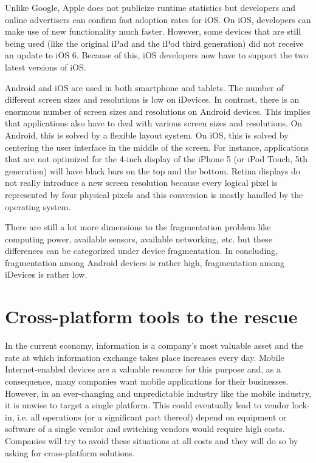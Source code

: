 Unlike Google, Apple does not publicize runtime statistics but developers \cite{Smith:2013} and online advertisers \cite{Chitika:2013} can confirm fast adoption rates for iOS. On iOS, developers can make use of new functionality much faster. However, some devices that are still being used (like the original iPad and the iPod third generation) did not receive an update to iOS 6. Because of this, iOS developers now have to support the two latest versions of iOS.

Android and iOS are used in both smartphone and tablets. The number of different screen sizes and resolutions is low on iDevices. In contrast, there is an enormous number of screen sizes and resolutions on Android devices. This implies that applications also have to deal with various screen sizes and resolutions. On Android, this is solved by a flexible layout system. On iOS, this is solved by centering the user interface in the middle of the screen. For instance, applications that are not optimized for the 4-inch display of the iPhone 5 (or iPod Touch, 5th generation) will have black bars on the top and the bottom. Retina displays do not really introduce a new screen resolution because every logical pixel is represented by four physical pixels and this conversion is mostly handled by the operating system.

There are still a lot more dimensions to the fragmentation problem like computing power, available sensors, available networking, etc. but these differences can be categorized under device fragmentation. In concluding, fragmentation among Android devices is rather high, fragmentation among iDevices is rather low.

\section{Cross-platform tools to the rescue}

In the current economy, information is a company's most valuable asset and the rate at which information exchange takes place increases every day. Mobile Internet-enabled devices are a valuable resource for this purpose and, as a consequence, many companies want mobile applications for their businesses. However, in an ever-changing and unpredictable industry like the mobile industry, it is unwise to target a single platform. This could eventually lead to vendor lock-in, i.e. all operations (or a significant part thereof) depend on equipment or software of a single vendor and switching vendors would require high costs. Companies will try to avoid  these situations at all costs and they will do so by asking for cross-platform solutions. 

